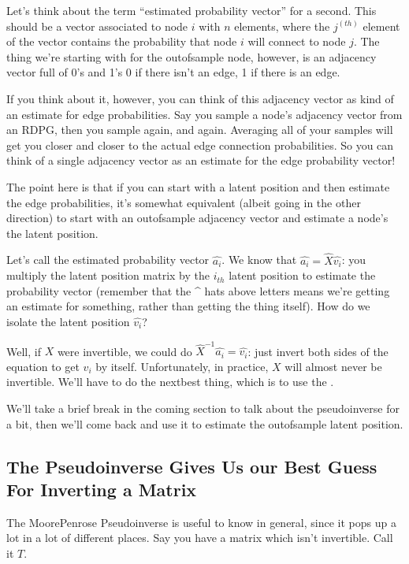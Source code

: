 \documentclass[letterpaper,10pt,english]{jupyterBook}
\begin{document}
\sphinxAtStartPar
Let’s think about the term “estimated probability vector” for a second. This should be a vector associated to node \(i\) with \(n\) elements, where the \(j^{(th)}\) element of the vector contains the probability that node \(i\) will connect to node \(j\). The thing we’re starting with for the out\sphinxhyphen{}of\sphinxhyphen{}sample node, however, is an adjacency vector full of 0’s and 1’s \sphinxhyphen{} 0 if there isn’t an edge, 1 if there is an edge.

\sphinxAtStartPar
If you think about it, however, you can think of this adjacency vector as kind of an estimate for edge probabilities. Say you sample a node’s adjacency vector from an RDPG, then you sample again, and again. Averaging all of your samples will get you closer and closer to the actual edge connection probabilities. So you can think of a single adjacency vector as an estimate for the edge probability vector!

\sphinxAtStartPar
The point here is that if you can start with a latent position and then estimate the edge probabilities, it’s somewhat equivalent (albeit going in the other direction) to start with an out\sphinxhyphen{}of\sphinxhyphen{}sample adjacency vector and estimate a node’s the latent position.

\sphinxAtStartPar
Let’s call the estimated probability vector \(\hat{a_i}\). We know that \(\hat{a_i} = \hat{X} \hat{v_i}\): you multiply the latent position matrix by the \(i_{th}\) latent position to estimate the probability vector (remember that the \textasciicircum{} hats above letters means we’re getting an estimate for something, rather than getting the thing itself). How do we isolate the latent position \(\hat{v_i}\)?

\sphinxAtStartPar
Well, if \(X\) were invertible, we could do \(\hat{X}^{-1} \hat{a_i} = \hat{v_i}\): just invert both sides of the equation to get \(v_i\) by itself. Unfortunately, in practice, \(X\) will almost never be invertible. We’ll have to do the next\sphinxhyphen{}best thing, which is to use the .

\sphinxAtStartPar
We’ll take a brief break in the coming section to talk about the pseudoinverse for a bit, then we’ll come back and use it to estimate the out\sphinxhyphen{}of\sphinxhyphen{}sample latent position.


\subsection{The Pseudoinverse Gives Us our Best Guess For Inverting a Matrix}
\label{\detokenize{applications/ch8/out-of-sample:the-pseudoinverse-gives-us-our-best-guess-for-inverting-a-matrix}}
\sphinxAtStartPar
The Moore\sphinxhyphen{}Penrose Pseudoinverse is useful to know in general, since it pops up a lot in a lot of different places. Say you have a matrix which isn’t invertible. Call it \(T\).
\end{document}
